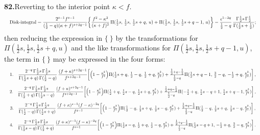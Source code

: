 \documentclass[11pt]{article}
\begin{document}
\noindent\textbf{82.}\quad Reverting to the interior point $\kappa<f$.
\[
\resizebox{\textwidth}{!}{$\displaystyle
\text{Disk-integral} = \frac{2^{s-1}f^{s-1}}{(\tfrac{1}{2}-q)(\kappa+f)^{s+2q-1}}\!\left\{\frac{f^{2}-\kappa^{2}}{(\kappa+f)^{2}}\,\Pi(\tfrac{1}{2}s,\,\tfrac{1}{2}s,\,\tfrac{1}{2}s+q,\,u) + \Pi(\tfrac{1}{2}s,\,\tfrac{1}{2}s,\,\tfrac{1}{2}s+q-1,\,u)\right\} - \frac{\epsilon^{1-2q}}{\tfrac{1}{2}-q}\,\frac{\Gamma\tfrac{1}{2}s\,\Gamma\tfrac{1}{2}}{\Gamma(\tfrac{1}{2}s+\tfrac{1}{2})};$}
\]
then reducing the expression in $\{\ \}$ by the transformations for $\Pi(\tfrac{1}{2}s,\tfrac{1}{2}s,\tfrac{1}{2}s+q,u)$ and the like transformations for $\Pi(\tfrac{1}{2}s,\tfrac{1}{2}s,\tfrac{1}{2}s+q-1,u)$, the term in $\{\ \}$ may be expressed in the four forms:
\[
\resizebox{\textwidth}{!}{$\displaystyle
1.\quad \frac{2^{-q}\,\Gamma\tfrac{1}{2}s\,\Gamma\tfrac{1}{2}s}{\Gamma(\tfrac{1}{2}s+q)\,\Gamma(\tfrac{1}{2}-q)}\,\frac{(f+\kappa)^{s+2q-1}}{f^{s+2q-1}}\!\left[\left(1-\tfrac{\kappa^{2}}{f^{2}}\right)\!\Pi(\tfrac{1}{2}s+q,\,\tfrac{1}{2}-q,\,\tfrac{1}{2}+q,\tfrac{\kappa^{2}}{f^{2}})+\tfrac{\tfrac{1}{2}+q-\tfrac{1}{2}}{\tfrac{1}{2}-q}\Pi(\tfrac{1}{2}s+q-1,\,\tfrac{3}{2}-q,\,-\tfrac{1}{2}+q,\tfrac{\kappa^{2}}{f^{2}})\right],$}
\]
\[
\resizebox{\textwidth}{!}{$\displaystyle
2.\quad \frac{2^{-q}\,\Gamma\tfrac{1}{2}s\,\Gamma\tfrac{1}{2}s}{\Gamma(\tfrac{1}{2}+q)\,\Gamma(\tfrac{1}{2}s-q)}\,\frac{(f+\kappa)^{s+2q-1}}{f^{s+2q-1}}\!\left[\left(1-\tfrac{\kappa^{2}}{f^{2}}\right)\!\Pi(\tfrac{1}{2}+q,\,\tfrac{1}{2}s-q,\,\tfrac{1}{2}s+q,\tfrac{\kappa^{2}}{f^{2}})+\tfrac{\tfrac{1}{2}+q-\tfrac{1}{2}}{\tfrac{1}{2}-q}\Pi(-\tfrac{1}{2}+q,\,\tfrac{1}{2}s-q+1,\,\tfrac{1}{2}s+q-1,\tfrac{\kappa^{2}}{f^{2}})\right],$}
\]
\[
\resizebox{\textwidth}{!}{$\displaystyle
3.\quad \frac{2^{-q}\,\Gamma\tfrac{1}{2}s\,\Gamma\tfrac{1}{2}s}{\Gamma(\tfrac{1}{2}-q)\,\Gamma(\tfrac{1}{2}s+q)}\,\frac{(f+\kappa)^{s-1}(f-\kappa)^{-2q}}{f^{s-1}}\!\left[\left(1-\tfrac{\kappa^{2}}{f^{2}}\right)\!\Pi(\tfrac{1}{2}-q,\,\tfrac{1}{2}s+q,\,\tfrac{1}{2}s-q,\tfrac{\kappa^{2}}{f^{2}})+\tfrac{\tfrac{1}{2}+q-\tfrac{1}{2}}{\tfrac{1}{2}-q}\Pi(\tfrac{1}{2}-q,\,\tfrac{1}{2}s+q,\,\tfrac{1}{2}s-q,\tfrac{\kappa^{2}}{f^{2}})\right],$}
\]
\[
\resizebox{\textwidth}{!}{$\displaystyle
4.\quad \frac{2^{-q}\,\Gamma\tfrac{1}{2}s\,\Gamma\tfrac{1}{2}s}{\Gamma(\tfrac{1}{2}s-q)\,\Gamma(\tfrac{1}{2}+q)}\,\frac{(f+\kappa)^{s-1}(f-\kappa)^{-2q}}{f^{s-1}}\!\left[\left(1-\tfrac{\kappa^{2}}{f^{2}}\right)\!\Pi(\tfrac{1}{2}s-q,\,\tfrac{1}{2}+q,\,\tfrac{1}{2}-q,\tfrac{\kappa^{2}}{f^{2}})+\tfrac{\tfrac{1}{2}+q-\tfrac{1}{2}}{\tfrac{1}{2}-q}\Pi(\tfrac{1}{2}s-q+1,\,-\tfrac{1}{2}+q,\,\tfrac{3}{2}-q,\tfrac{\kappa^{2}}{f^{2}})\right].$}
\]
\end{document}
